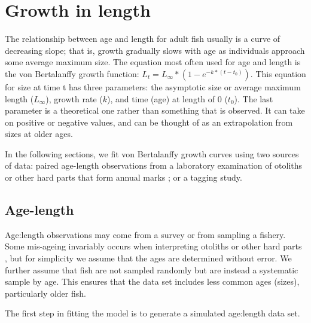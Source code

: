 \documentclass[
]{krantz}
\begin{document}
\hypertarget{vonBert}{%
\section{Growth in length}\label{vonBert}}

The relationship between age and length for adult fish usually is a curve of decreasing slope; that is, growth gradually slows with age as individuals approach some average maximum size. The equation most often used for age and length is the von Bertalanffy growth function: \(L_t=L_\infty*(1-e^{-k*(t-t_0)})\). This equation for size at time t has three parameters: the asymptotic size or average maximum length (\(L_\infty\)), growth rate (\(k\)), and time (age) at length of 0 (\(t_0\)). The last parameter is a theoretical one rather than something that is observed. It can take on positive or negative values, and can be thought of as an extrapolation from sizes at older ages.

In the following sections, we fit von Bertalanffy growth curves using two sources of data: paired age-length observations from a laboratory examination of otoliths or other hard parts that form annual marks \citep{campana2001}; or a tagging study.

\hypertarget{Otolith}{%
\subsection{Age-length}\label{Otolith}}

Age:length observations may come from a survey or from sampling a fishery. Some mis-ageing invariably occurs when interpreting otoliths or other hard parts \citep{campana2001}, but for simplicity we assume that the ages are determined without error. We further assume that fish are not sampled randomly but are instead a systematic sample by age. This ensures that the data set includes less common ages (sizes), particularly older fish.

The first step in fitting the model is to generate a simulated age:length data set.
\end{document}
